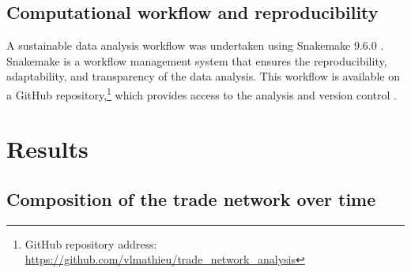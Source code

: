 \documentclass[
  authoryear,
  review,
  3p]{elsarticle}
\begin{document}
\subsection{Computational workflow and
reproducibility}\label{computational-workflow-and-reproducibility}

A sustainable data analysis workflow was undertaken using Snakemake
9.6.0 \citep{molder2021sustainable}. Snakemake is a workflow management
system that ensures the reproducibility, adaptability, and transparency
of the data analysis. This workflow is available on a GitHub
repository,\footnote{GitHub repository address:
  \url{https://github.com/vlmathieu/trade_network_analysis}} which
provides access to the analysis and version control
\citep{braga2023not}.

\section{Results}\label{results}

\subsection{Composition of the trade network over
time}\label{composition-of-the-trade-network-over-time}
\end{document}
